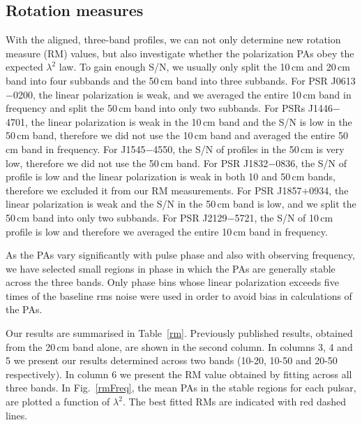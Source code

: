 \documentclass[useAMS,usenatbib]{mn2e}
\begin{document}
\subsection{Rotation measures}


With the aligned, three-band profiles, we can not only determine new rotation 
measure (RM) values, but also investigate whether the polarization PAs obey the 
expected $\lambda^2$ law.
%
To gain enough S/N, we usually only split the 10\,cm and 20\,cm band into four subbands 
and the 50\,cm band into three subbands. For PSR J0613$-$0200, the linear polarization is 
weak, and we averaged the entire 10\,cm band in frequency and split the 50\,cm band into only 
two subbands. For PSRs J1446$-$4701, the linear polarization is weak in the 10\,cm 
band and the S/N is low in the 50\,cm band, therefore we did not use the 10\,cm band 
and averaged the entire 50\,cm band in frequency. For J1545$-$4550, the S/N of profiles 
in the 50\,cm is very low, therefore we did not use the 50\,cm band. For PSR J1832$-$0836, 
the S/N of profile is low and the linear polarization is weak in both 10 and 50\,cm bands, 
therefore we excluded it from our RM measurements. For PSR J1857$+$0934, 
the linear polarization is weak and the S/N in the 50\,cm band is low, and we 
split the 50\,cm band into only two subbands. For PSR J2129$-$5721, 
the S/N of 10\,cm profile is low and therefore we averaged the entire 10\,cm band 
in frequency. 
%

As the PAs vary significantly with pulse phase and also with observing frequency, 
we have selected small regions in phase in which the PAs are generally stable across 
the three bands. Only phase bins whose linear polarization exceeds five times of 
the baseline rms noise were used in order to avoid bias in calculations of the PAs.
%

Our results are summarised in Table~\ref{rm}. Previously published results, obtained 
from the 20\,cm band alone, are shown in the second column. In columns 3, 4 and 5 we 
present our results determined across two bands (10-20, 10-50 and 20-50 respectively).  
In column 6 we present the RM value obtained by fitting across all three bands.  
In Fig.~\ref{rmFreq}, the mean PAs in the stable regions for each pulsar, are plotted 
a function of $\lambda^2$. The best fitted RMs are indicated with red dashed lines. 
\end{document}
